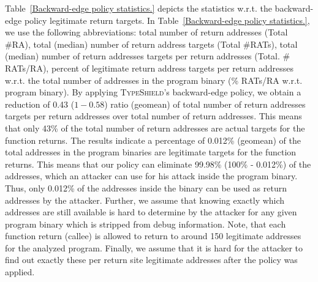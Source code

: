 Table~\ref{Backward-edge policy statistics.} depicts the statistics w.r.t. the backward-edge policy legitimate return targets.
In Table~\ref{Backward-edge policy statistics.}, we use the following abbreviations:
total number of return addresses (Total \#RA),
total (median) number of return address targets (Total \#RATs),
total (median) number of return addresses targets per return addresses (Total. \# RATs/RA),
percent of legitimate return address targets per return addresses w.r.t. the total number of addresses in the program binary (\% RATs/RA w.r.t. program binary).
By applying \textsc{TypeShield}'s backward-edge policy, we obtain a reduction of 0.43 ($1-0.58$) ratio (geomean)
of total number of return addresses targets per return addresses over total number of return addresses. This means that only 43\% of the total number of return addresses are actual targets
for the function returns. The results indicate a percentage of 0.012\% (geomean) of the total addresses in the program binaries are legitimate targets for the function returns. This means
that our policy can eliminate 99.98\% (100\% - 0.012\%) of the addresses, which an attacker can use for his attack inside the program binary.
Thus, only 0.012\% of the addresses inside
the binary can be used as return addresses by the attacker.
Further, we assume that knowing exactly which addresses are
still available is hard to determine by the attacker for any given
program binary which is stripped from debug information.
Note, that each function return (callee) is allowed to return
to around 150 legitimate addresses for the analyzed program.
Finally, we assume that it is hard for the attacker to find
out exactly these per return site legitimate addresses after the
policy was applied.

% 
% 

